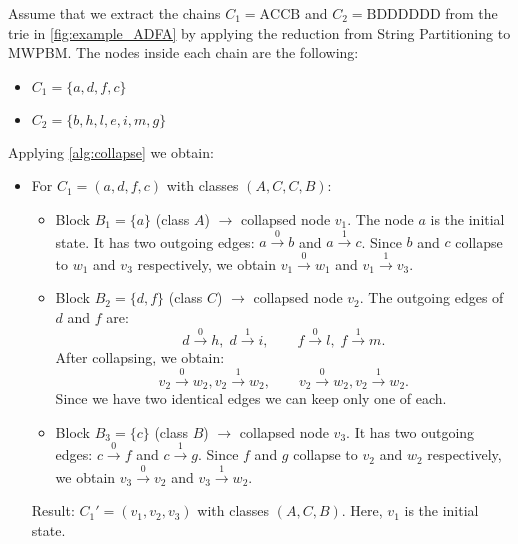 \begin{example}
    Assume that we extract the chains $C_1 = \text{ACCB}$ and $C_2 = \text{BDDDDDD}$ from the trie in \cref{fig:example_ADFA} by applying the reduction from String Partitioning to MWPBM. The nodes inside each chain are the following:
    \begin{itemize}
        \item $C_1 = \{a,d,f,c\}$
        \item $C_2 = \{b,h,l,e,i,m,g\}$
    \end{itemize}
    
    Applying \cref{alg:collapse} we obtain:
    \begin{itemize}
        \item For $C_1 = (a,d,f,c)$ with classes $(A,C,C,B)$: 
        \begin{itemize}
            \item Block $B_1 = \{a\}$ (class $A$) $\rightarrow$ collapsed node $v_1$. The node $a$ is the initial state. It has two outgoing edges: $a \xrightarrow{0} b$ and $a \xrightarrow{1} c$. Since $b$ and $c$ collapse to $w_1$ and $v_3$ respectively, we obtain $v_1 \xrightarrow{0} w_1$ and $v_1 \xrightarrow{1} v_3$.
            \item Block $B_2 = \{d,f\}$ (class $C$) $\rightarrow$ collapsed node $v_2$. The outgoing edges of $d$ and $f$ are:
            \[
                d \xrightarrow{0} h,\; d \xrightarrow{1} i,\qquad
                f \xrightarrow{0} l,\; f \xrightarrow{1} m.
            \]
            After collapsing, we obtain:
            \[
                v_2 \xrightarrow{0} w_2, v_2 \xrightarrow{1} w_2,\qquad v_2 \xrightarrow{0} w_2, v_2 \xrightarrow{1} w_2.
            \]
            Since we have two identical edges we can keep only one of each.
            \item Block $B_3 = \{c\}$ (class $B$) $\rightarrow$ collapsed node $v_3$. It has two outgoing edges: $c \xrightarrow{0} f$ and $c \xrightarrow{1} g$. Since $f$ and $g$ collapse to $v_2$ and $w_2$ respectively, we obtain $v_3 \xrightarrow{0} v_2$ and $v_3 \xrightarrow{1} w_2$.
        \end{itemize}
        Result: $C_1' = (v_1, v_2, v_3)$ with classes $(A, C, B)$. Here, $v_1$ is the initial state.
        

\end{itemize}
\end{example}
